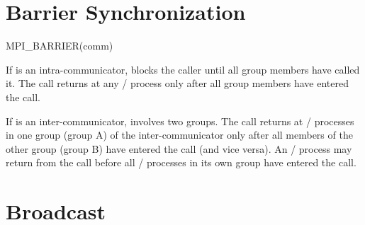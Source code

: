 \section{Barrier Synchronization}
\label{sec:coll-barrier}

\begin{funcdef}{MPI\_BARRIER}{(\mbox{comm})}
\end{funcdef}

If  is an intra-communicator,
 blocks the caller until all group members have called
it. The call returns at any \MPI/ process only after all group members have
entered the call.

If  is an inter-communicator,  involves two groups.
The call returns at \MPI/ processes in one group (group A) of the inter-communicator
only after all members of the other group (group B) have entered the call (and vice
versa).  An \MPI/ process may return from the call before all \MPI/ processes in its own group
have entered the call.

\section{Broadcast}
\label{sec:coll-broadcast}

